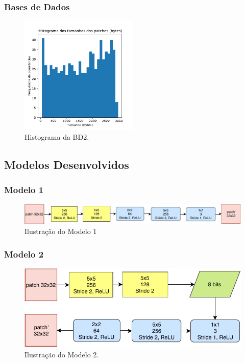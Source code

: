 \documentclass{beamer}
\begin{document}
\begin{frame}
\frametitle{Bases de Dados}
\begin{figure}
\includegraphics[width=0.5\textwidth]{figs/hist2.pdf}
\caption{Histograma da BD2.}
\end{figure}
\end{frame}
\subsection{Modelos Desenvolvidos}
\begin{frame}
\frametitle{Modelo 1}
\begin{figure}
\includegraphics[width=\textwidth]{figs/conv_ae.pdf}
\caption{Ilustração do Modelo 1}
\end{figure}
\end{frame}

\begin{frame}
\frametitle{Modelo 2}
\begin{figure}
\includegraphics[width=\textwidth]{figs/conv_ae_bin.pdf}
\caption{Ilustração do Modelo 2.}
\end{figure}
\end{frame}
\end{document}
